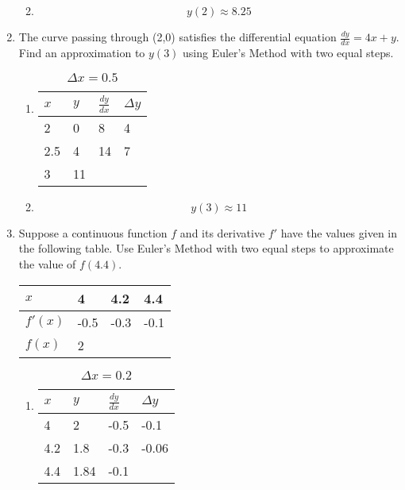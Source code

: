 \documentclass[12pt]{article}
\begin{document}
\begin{enumerate}
\begin{enumerate}
\begin{table}[h]
\end{table}
\item $$y(2)\approx 8.25$$
\end{enumerate}
\newpage
\item The curve passing through (2,0) satisfies the differential equation $\frac{dy}{dx}=4x+y$.
Find an approximation to $y(3)$ using Euler's Method with two equal steps. 
\begin{enumerate}
    \item 

\begin{table}[h]
\caption{$\Delta x = 0.5$}
\centering \label{table_example}

\begin{tabular}{l|lll}
$x$ & \multicolumn{1}{l|}{$y$} & \multicolumn{1}{l|}{$\frac{dy}{dx}$} & $\Delta y$ \\ \hline
2 & 0 & 8 & 4 \\
2.5 & 4 & 14 & 7 \\
3 & 11 &  & 
\end{tabular}

\end{table}
\item $$y(3)\approx 11$$
\end{enumerate}

\item Suppose a continuous function $f$ and its derivative $f'$ have the values given in the following table. Use Euler's Method with two equal steps to approximate the value of $f(4.4)$.

\begin{table}[h]
\centering
\begin{tabular}{l|l|l|l}
$x$ & 4 & 4.2 & 4.4 \\ \hline  
$f'(x)$ & -0.5 & -0.3 & -0.1  \\ \hline  
$f(x)$ & 2 & &
\end{tabular}
\end{table}
\newpage
\begin{enumerate}
    \item 

\begin{table}[h]
\caption{$\Delta x = 0.2$}
\centering \label{table_example}
\begin{tabular}{l|lll}
$x$ & \multicolumn{1}{l|}{$y$} & \multicolumn{1}{l|}{$\frac{dy}{dx}$} & $\Delta y$ \\ \hline
4 & 2 & -0.5 & -0.1 \\
4.2 & 1.8 & -0.3 & -0.06 \\
4.4 & 1.84 & -0.1 & 
\end{tabular}



\end{table}
\end{enumerate}
\end{enumerate}
\end{document}
